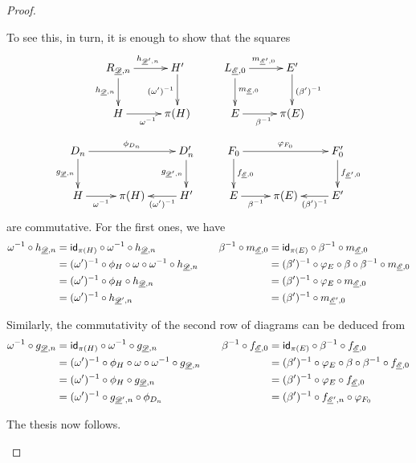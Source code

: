 \begin{proof}
\begin{itemize}
To see this, in turn, it is enough to show that	the squares
\[\xymatrix{R_{\der{D}, n} \ar[d]_{h_{\der{D}, n}}\ar[r]^{h_{\der{D}', n}} & H' \ar[d]_{(\omega')^{-1}} &L_{\der{E}, 0} \ar[d]^{m_{\der{E}, 0}}\ar[r]^{m_{\der{E}', 0}}& E' \ar[d]^{(\beta')^{-1}}\\H\ar[r]_{\omega^{-1}} &\pi(H)&E \ar[r]_{\beta^{-1}} & \pi(E)}\]
\[\xymatrix{D_n \ar[rr]^{\phi_{D_n}} \ar[d]_{g_{\der{D}, n}}&&D'_n \ar[d]_{g_{\der{D}', n}}&F_0 \ar[d]^{f_{\der{E}, 0}} \ar[rr]^{\varphi_{F_0}} && F_0' \ar[d]^{f_{\der{E}', 0}}\\H \ar[r]_-{\omega^{-1}} &\pi(H)&H' \ar[l]^-{(\omega')^{-1}}  &E \ar[r]_-{\beta^{-1}} & \pi(E) & E' \ar[l]^-{(\beta')^{-1}}}\]
are commutative. For the first ones, we have
\[
\begin{split} 
	\omega^{-1} \circ h_{\underline{\mathscr{D}}, n}&=\mathsf{id}_{\pi(H)}\circ \omega^{-1} \circ h_{\underline{\mathscr{D}}, n} \\&=(\omega')^{-1}\circ \phi_H \circ \omega \circ \omega^{-1} \circ h_{\underline{\mathscr{D}}, n}\\&=(\omega')^{-1}\circ \phi_H  \circ h_{\underline{\mathscr{D}}, n}\\&=(\omega')^{-1}  \circ h_{\underline{\mathscr{D}}', n}
\end{split} \qquad  	\begin{split} 
\beta^{-1} \circ m_{\underline{\mathscr{E}}, 0}&=\mathsf{id}_{\pi(E)}\circ \beta^{-1} \circ m_{\underline{\mathscr{E}}, 0}\\&=(\beta')^{-1}\circ \varphi_{E} \circ \beta \circ \beta^{-1} \circ m_{\underline{\mathscr{E}}, 0}\\&=(\beta')^{-1}\circ \varphi_{E}  \circ m_{\underline{\mathscr{E}}, 0}\\&=(\beta')^{-1}  \circ m_{\underline{\mathscr{E}}', 0}
\end{split}  \]

Similarly, the commutativity of the second row of diagrams can be deduced from
\[\begin{split}
\omega^{-1} \circ g_{\underline{\mathscr{D}}, n}&=\mathsf{id}_{\pi(H)}\circ \omega^{-1} \circ g_{\underline{\mathscr{D}}, n}\\&=(\omega')^{-1}\circ \phi_H \circ \omega\circ \omega^{-1} \circ g_{\underline{\mathscr{D}}, n}\\&=(\omega')^{-1}\circ \phi_H  \circ g_{\underline{\mathscr{D}}, n}\\&= (\omega')^{-1} \circ g_{\underline{\mathscr{D}}', n}\circ \phi_{D_n}
\end{split}\qquad \begin{split}\beta^{-1} \circ f_{\underline{\mathscr{E}}, 0}&=\mathsf{id}_{\pi(E)}\circ \beta^{-1} \circ f_{\underline{\mathscr{E}}, 0}\\&=(\beta')^{-1}\circ \varphi_E \circ \beta\circ \beta^{-1} \circ f_{\underline{\mathscr{E}}, 0}\\&=(\beta')^{-1}\circ \varphi_E  \circ f_{\underline{\mathscr{E}}, 0}\\&= (\beta')^{-1} \circ f_{\underline{\mathscr{E}}', n}\circ \varphi_{F_0}
\end{split}\]

 The thesis now follows.	\qedhere 
\end{itemize}	
\end{proof}


